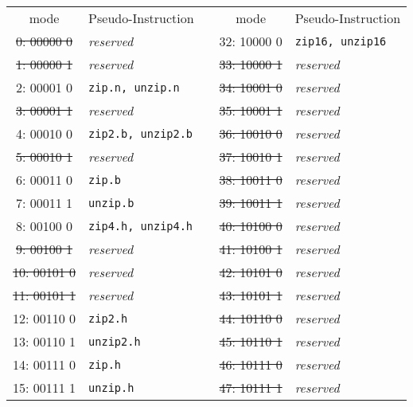 \begin{table}[h]
\begin{small}
\begin{center}
\begin{tabular}{c l p{1in} c l}
      mode     & Pseudo-Instruction       &   &         mode     & Pseudo-Instruction      \\

\cline{1-2}
\cline{4-5}

\sout{ 0: 00000 0} & {\it reserved}           &   &         32: 10000 0  & {\tt zip16, unzip16}    \\
\sout{ 1: 00000 1} & {\it reserved}           &   &   \sout{33: 10000 1} & {\it reserved}          \\
       2: 00001 0  & {\tt zip.n, unzip.n}     &   &   \sout{34: 10001 0} & {\it reserved}          \\
\sout{ 3: 00001 1} & {\it reserved}           &   &   \sout{35: 10001 1} & {\it reserved}          \\
       4: 00010 0  & {\tt zip2.b, unzip2.b}   &   &   \sout{36: 10010 0} & {\it reserved}          \\
\sout{ 5: 00010 1} & {\it reserved}           &   &   \sout{37: 10010 1} & {\it reserved}          \\
       6: 00011 0  & {\tt zip.b}              &   &   \sout{38: 10011 0} & {\it reserved}          \\
       7: 00011 1  & {\tt unzip.b}            &   &   \sout{39: 10011 1} & {\it reserved}          \\

\cline{1-2}
\cline{4-5}

       8: 00100 0  & {\tt zip4.h, unzip4.h}   &   &   \sout{40: 10100 0} & {\it reserved}          \\
\sout{ 9: 00100 1} & {\it reserved}           &   &   \sout{41: 10100 1} & {\it reserved}          \\
\sout{10: 00101 0} & {\it reserved}           &   &   \sout{42: 10101 0} & {\it reserved}          \\
\sout{11: 00101 1} & {\it reserved}           &   &   \sout{43: 10101 1} & {\it reserved}          \\
      12: 00110 0  & {\tt zip2.h}             &   &   \sout{44: 10110 0} & {\it reserved}          \\
      13: 00110 1  & {\tt unzip2.h}           &   &   \sout{45: 10110 1} & {\it reserved}          \\
      14: 00111 0  & {\tt zip.h}              &   &   \sout{46: 10111 0} & {\it reserved}          \\
      15: 00111 1  & {\tt unzip.h}            &   &   \sout{47: 10111 1} & {\it reserved}          \\


\end{tabular}
\end{center}
\end{small}
\end{table}
